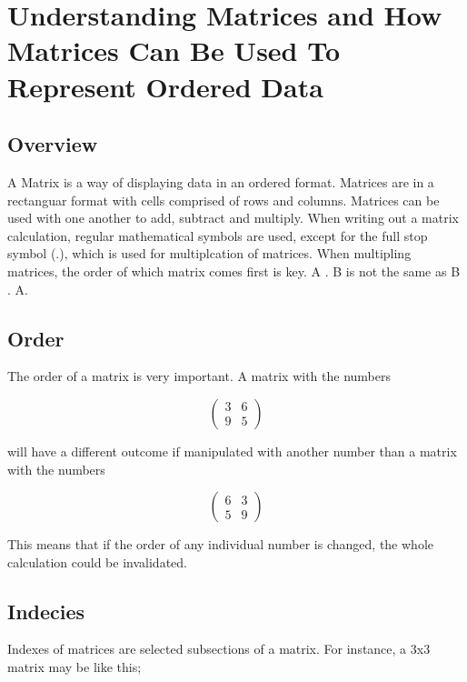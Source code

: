 \documentclass[a4paper,12pt]{article}
\begin{document}
  \newpage

  \section{Understanding Matrices and How Matrices Can Be Used To Represent Ordered Data}
    \subsection{Overview}
      A Matrix is a way of displaying data in an ordered format. Matrices are in a rectanguar format with cells comprised of rows and columns. Matrices can be used with one another to add, subtract and multiply. When writing out a matrix calculation, regular mathematical symbols are used, except for the full stop symbol (.), which is used for multiplcation of matrices. When multipling matrices, the order of which matrix comes first is key. \textsc{A . B} is not the same as \textsc{B . A}.
    \subsection{Order}
      The order of a matrix is very important. A matrix with the numbers

      \begin{equation}
        \begin{pmatrix}
          3 & 6\\
          9 & 5
        \end{pmatrix}
      \end{equation}

      will have a different outcome if manipulated with another number than a matrix with the numbers

      \begin{equation}
        \begin{pmatrix}
          6 & 3\\
          5 & 9
        \end{pmatrix}
      \end{equation}

      This means that if the order of any individual number is changed, the whole calculation could be invalidated.

    \newpage

    \subsection{Indecies}
    Indexes of matrices are selected subsections of a matrix. For instance, a 3x3 matrix may be like this;
\end{document}
